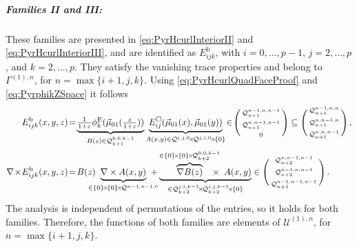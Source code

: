 \subparagraph{Families II and III:}
These families are presented in \eqref{eq:PyrHcurlInteriorII} and \eqref{eq:PyrHcurlInteriorIII}, and are identified as $E_{ijk}^\mathrm{b}$, with $i=0,\ldots,p-1$, $j=2,\ldots,p$, and $k=2,\ldots,p$.
They satisfy the vanishing trace properties and belong to $\Gamma^{(1),n}$, for $n=\max\{i+1,j,k\}$.
Using \eqref{eq:PyrHcurlQuadFaceProof} and \eqref{eq:PyrphikZSpace} it follows
\begin{equation}
\begin{aligned}
	E_{ijk}^\mathrm{b}(x,y,z)&\!=\!
		\underbrace{\textstyle{\frac{1}{1+z}}\phi_k^\E(\vec{\mu}_{01}(\szzz))}_{B(z)\in\mathcal{Q}_{k+1}^{0,0,k-1}} 
		\underbrace{E_{ij}^\square(\vec{\mu}_{01}(x),\vec{\mu}_{01}(y))}_{A(x,y)
			\in\mathcal{Q}^{i,j,0}\!\times\!\mathcal{Q}^{j,i,0}\!\times\!\{0\}}
				\!\in\!\Bigg(\begin{smallmatrix}\mathcal{Q}_{n+1}^{n-1,n,n-1}\\[2pt]\mathcal{Q}_{n+1}^{n,n-1,n-1}\\[2pt]0\end{smallmatrix}\Bigg)
					\subseteq\Bigg(\begin{smallmatrix}\mathcal{Q}_{n+1}^{n-1,n,n}\\[2pt]\mathcal{Q}_{n+1}^{n,n-1,n}\\[2pt]
						\mathcal{Q}_{n+1}^{n,n,n-1}\end{smallmatrix}\Bigg)\,,\\
	\nabla\!\times\! E_{ijk}^\mathrm{b}(x,y,z)&\!=\!B(z)\!\!\!\!\!\!
		\underbrace{\nabla\times A(x,y)}_{\in\{0\}\!\times\!\{0\}\!\times\!\mathcal{Q}^{n-1,n-1,0}}\!\!\!\!\!\!
				+\underbrace{\overbrace{\nabla B(z)}^{\in\{0\}\!\times\!\{0\}\!\times\!\mathcal{Q}_{k+2}^{0,0,k-1}}
					\!\!\!\!\!\!\times\,\,\, A(x,y)}_{\in\mathcal{Q}_{k+2}^{j,i,k-1}\!\times\!\mathcal{Q}_{k+2}^{i,j,k-1}\!\times\!\{0\}}
						\in\Bigg(\begin{smallmatrix}\mathcal{Q}_{n+2}^{n,n-1,n-1}\\[2pt]\mathcal{Q}_{n+2}^{n-1,n,n-1}\\[2pt]
							\mathcal{Q}_{n+1}^{n-1,n-1,n-1}\end{smallmatrix}\Bigg)\,.
\end{aligned}
\label{eq:PyrHcurlInteriorIIProof}
\end{equation}
The analysis is independent of permutations of the entries, so it holds for both families.
Therefore, the functions of both families are elements of $\mathcal{U}^{(1),n}$, for $n=\max\{i+1,j,k\}$.

